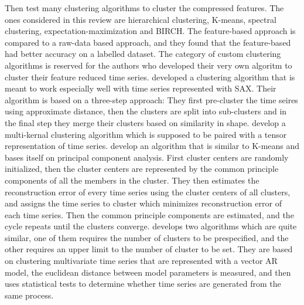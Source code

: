 Then test many clustering algorithms to cluster the compressed features. 
The ones considered in this review are hierarchical clustering, K-means, spectral clustering, expectation-maximization and BIRCH. 
The feature-based approach is compared to a raw-data based approach, and they found that the feature-based had better accuracy on a labelled dataset.
The category of custom clustering algorithms is reserved for the authors who developed their very own algoritm to cluster their feature reduced time series. 
\textcite{clust_large_datasets_aghabozorg} developed a clustering algorithm that is meant to work especially well with time series represented with SAX.
Their algorithm is based on a three-step approach: They first pre-cluster the time seires using approximate distance, 
then the clusters are split into sub-clusters and in the final step they merge their clusters based on similarity in shape. 
\textcite{tensor_multi_elastic_kernel_tsc} develop a multi-kernal clustering algorithm which is supposed to be paired with a tensor representation of time series. 
\textcite{multivariate_tsc_common_pca} develop an algorithm that is similar to K-means and bases itself on principal component analysis. 
First cluster centers are randomly initialized, then the cluster centers are represented by the common principle components of all the members in the cluster.
They then estimates the reconstruction error of every time series using the cluster centers of all clusters, and assigns the time series to cluster which minimizes reconstruction error of each time series. 
Then the common principle components are estimated, and the cycle repeats until the clusters converge. 
\textcite{var_multivar_tsc} develops two algorithms which are quite similar, one of them requires the number of clusters to be prespecified, and the other requires an upper limit to the number of cluster to be set. 
They are based on clustering multivariate time series that are represented with a vector AR model, the euclidean distance between model parameters is measured, 
and then uses statistical tests to determine whether time series are generated from the same process.


